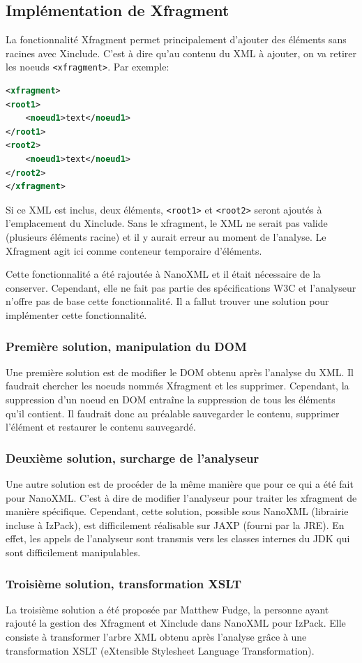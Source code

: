 \subsection{Implémentation de Xfragment}
La fonctionnalité Xfragment permet principalement d'ajouter des éléments sans racines avec Xinclude.
C'est à dire qu'au contenu du XML à ajouter, on va retirer les noeuds \verb|<xfragment>|.
Par exemple:
\begin{lstlisting}[language=XML]
<xfragment>
<root1>
	<noeud1>text</noeud1>
</root1>
<root2>
	<noeud1>text</noeud1>
</root2>
</xfragment>
\end{lstlisting}
Si ce XML est inclus, deux éléments, \verb|<root1>| et \verb|<root2>| seront ajoutés à l'emplacement du Xinclude.
Sans le xfragment, le XML ne serait pas valide (plusieurs éléments racine) et il y aurait erreur au moment de l'analyse.
Le Xfragment agit ici comme conteneur temporaire d'éléments.

Cette fonctionnalité a été rajoutée à NanoXML et il était nécessaire de la conserver.
Cependant, elle ne fait pas partie des spécifications W3C et l'analyseur n'offre pas de base cette fonctionnalité.
Il a fallut trouver une solution pour implémenter cette fonctionnalité.

\subsubsection{Première solution, manipulation du DOM}
Une première solution est de modifier le DOM obtenu après l'analyse du XML. 
Il faudrait chercher les noeuds nommés Xfragment et les supprimer.
Cependant, la suppression d'un noeud en DOM entraîne la suppression de tous les éléments qu'il contient.
Il faudrait donc au préalable sauvegarder le contenu, supprimer l'élément et restaurer le contenu sauvegardé.

\subsubsection{Deuxième solution, surcharge de l'analyseur}
Une autre solution est de procéder de la même manière que pour ce qui a été fait pour NanoXML.
C'est à dire de modifier l'analyseur pour traiter les xfragment de manière spécifique.
Cependant, cette solution, possible sous NanoXML (librairie incluse à IzPack), est difficilement réalisable sur JAXP (fourni par la JRE).
En effet, les appels de l'analyseur sont transmis vers les classes internes du JDK qui sont difficilement manipulables.
\subsubsection{Troisième solution, transformation XSLT}
La troisième solution a été proposée par Matthew Fudge, la personne ayant rajouté la gestion des Xfragment et Xinclude dans NanoXML pour IzPack.
Elle consiste à transformer l'arbre XML obtenu après l'analyse grâce à une transformation XSLT (eXtensible Stylesheet Language Transformation).

